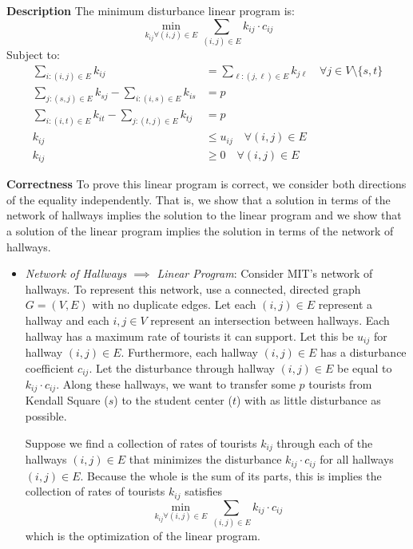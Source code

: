 \documentclass[12pt,twoside]{article}
\begin{document}
\begin{problems}

\problem  %

\begin{problemparts}

\problempart %

{\bf Description} The minimum disturbance linear program is:
$$ \min_{k_{ij} \forall (i, j) \in E} \sum_{(i, j) \in E} k_{ij} \cdot c_{ij} $$
Subject to:
\begin{align*}
  \sum_{i:(i, j) \in E} k_{ij} &= \sum_{\ell:(j, \ell) \in E} k_{j\ell}\quad
  \forall j \in V \setminus \{s, t\} \\
  \sum_{j:(s, j) \in E} k_{sj} - \sum_{i:(i, s) \in E} k_{is} &= p \\
  \sum_{i:(i, t) \in E} k_{it} - \sum_{j:(t, j) \in E} k_{tj} &= p \\
  k_{ij} &\leq u_{ij}\quad \forall (i, j) \in E \\
  k_{ij} &\geq 0\quad \forall (i, j) \in E
\end{align*}

{\bf Correctness} To prove this linear program is correct, we consider both
directions of the equality independently. That is, we show that a solution in
terms of the network of hallways implies the solution to the linear program
and we show that a solution of the linear program implies the solution in
terms of the network of hallways.

\begin{itemize}

  \item {\it Network of Hallways $\implies$ Linear Program}: Consider MIT's
  network of hallways. To represent this network, use a connected, directed
  graph $G = (V, E)$ with no duplicate edges. Let each $(i, j) \in E$
  represent a hallway and each $i,j \in V$ represent an intersection between
  hallways. Each hallway has a maximum rate of tourists it can support. Let
  this be $u_{ij}$ for hallway $(i, j) \in E$. Furthermore, each hallway $(i,
  j) \in E$ has a disturbance coefficient $c_{ij}$. Let the disturbance
  through hallway $(i, j) \in E$ be equal to $k_{ij} \cdot c_{ij}$. Along
  these hallways, we want to transfer some $p$ tourists from Kendall Square
  ($s$) to the student center ($t$) with as little disturbance as possible.

  Suppose we find a collection of rates of tourists $k_{ij}$ through each of
  the hallways $(i, j) \in E$ that minimizes the disturbance $k_{ij} \cdot
  c_{ij}$ for all hallways $(i, j) \in E$. Because the whole is the sum of
  its parts, this is implies the collection of rates of tourists $k_{ij}$
  satisfies
  $$ \min_{k_{ij} \forall (i, j) \in E} \sum_{(i, j) \in E} k_{ij} \cdot
  c_{ij} $$
  which is the optimization of the linear program. 
  

\end{itemize}
\end{problemparts}
\end{problems}
\end{document}
